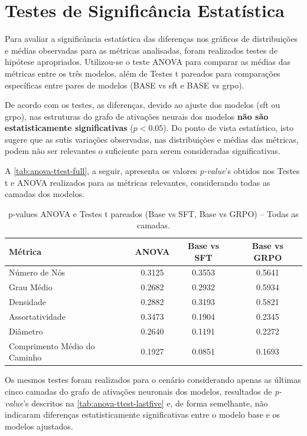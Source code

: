 \section{Testes de Significância Estatística}

Para avaliar a significância estatística das diferenças nos gráficos de distribuições e médias observadas para as métricas analisadas, foram realizados testes de hipótese apropriados. Utilizou-se o teste ANOVA para comparar as médias das métricas entre os três modelos, além de Testes t pareados para comparações específicas entre pares de modelos (BASE vs \gls{sft} e BASE vs \gls{grpo}).

De acordo com os testes, as diferenças, devido ao ajuste dos modelos (\gls{sft} ou \gls{grpo}), nas estruturas do grafo de ativações neurais dos modelos \textbf{não são estatisticamente significativas} ($p < 0.05$). Do ponto de vista estatístico, isto sugere que as sutis variações observadas, nas distribuições e médias das métricas, podem não ser relevantes o suficiente para serem consideradas significativas.

A \autoref{tab:anova-ttest-full}, a seguir, apresenta os valores \textit{p-value}'s obtidos nos Testes t e ANOVA realizados para as métricas relevantes, considerando todas as camadas dos modelos.

\begin{table}[ht]
\centering
\caption{p-values ANOVA e Testes t pareados (Base vs SFT, Base vs GRPO) – Todas as camadas.}
\label{tab:anova-ttest-full}
\begin{tabular}{|l|c|c|c|}
\hline
Métrica & ANOVA & Base vs SFT & Base vs GRPO \\
\hline
Número de Nós & 0.3125 & 0.3553 & 0.5641 \\
Grau Médio & 0.2682 & 0.2932 & 0.5934 \\
Densidade & 0.2882 & 0.3193 & 0.5821 \\
Assortatividade & 0.3473 & 0.1904 & 0.2345 \\
Diâmetro & 0.2640 & 0.1191 & 0.2272 \\
Comprimento Médio do Caminho & 0.1927 & 0.0851 & 0.1693 \\
\hline
\end{tabular}
\fonte{}
\end{table}

Os mesmos testes foram realizados para o cenário considerando apenas as últimas cinco camadas do grafo de ativações neuronais dos modelos, resultados de \textit{p-value}'s descritos na \autoref{tab:anova-ttest-lastfive} e, de forma semelhante, não indicaram diferenças estatisticamente significativas entre o modelo base e os modelos ajustados.

